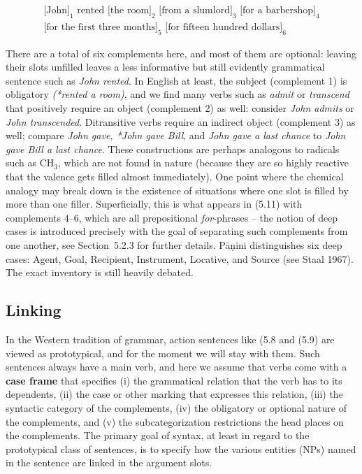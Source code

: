 \begin{eqnarray}
\mbox{[John]}_1 \mbox{ rented} \mbox{ [the room]}_2 
\mbox{ [from a slumlord]}_3 \mbox{ [for a barbershop]}_4  \nonumber \\
\mbox{[for the first three months]}_5 
\mbox{ [for fifteen hundred dollars]}_6 
\end{eqnarray}

\noindent There are a total of six complements here, and most of them are
optional: leaving their slots unfilled leaves a less informative but still
evidently grammatical sentence such as {\it John rented}. In English at least,
the subject (complement 1) is obligatory {\it (*rented a room)}, and we find
many verbs such as {\it admit} or {\it transcend} that positively require an
object (complement 2) as well: consider {\it *John admits} or {\it *John
  transcended}. Ditransitive verbs require an indirect object (complement 3)
as well; compare {\it *John gave, *John gave Bill}, and {\it *John gave a last
  chance} to {\it John gave Bill a last chance}.  These constructions are
perhaps analogous to radicals such as CH$_3$, which are not found in nature
(because they are so highly reactive that the valence gets filled almost
immediately).  One point where the chemical analogy may break down is the
existence of situations where one slot is filled by more than one filler.
Superficially, this is what appears in (5.11) with complements 4--6, which are
all prepositional {\it for}-phrases -- the notion of deep cases is introduced
precisely with the goal of separating such complements from one another, see
Section~5.2.3 for further details.  P\={a}\d{n}ini distinguishes six deep
cases: Agent, Goal, Recipient, Instrument, Locative, and Source (see
\nocite{Staal:1967} Staal 1967). The exact inventory is still heavily
debated.

\subsection{Linking}

In the Western tradition of grammar, action sentences like (5.8 and (5.9) are
viewed as prototypical, and for the moment we will stay with them.  Such
sentences always have a main verb, and here we assume that verbs come with a
{\bf case frame} that specifies (i) the grammatical relation that the verb has
to its dependents, (ii) the case or other marking that expresses this
relation, (iii) the syntactic category of the complements, (iv) the obligatory
or optional nature of the complements, and (v) the subcategorization
restrictions the head places on the complements. The primary goal of syntax,
at least in regard to the prototypical class of sentences, is to specify how
the various entities (NPs) named in the sentence are linked in the argument
slots.

